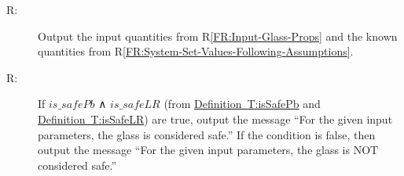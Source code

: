 \documentclass[12pt]{article}
\newcounter{reqnum}
\newcommand{\rthereqnum}{R\thereqnum}
\begin{document}
\begin{description}
\item[\rthereqnum\label{FR:Output-Values-and-Known-Quantities}:]Output the input quantities from R\ref{FR:Input-Glass-Props} and the known quantities from R\ref{FR:System-Set-Values-Following-Assumptions}.
\end{description}
\begin{description}
\item[\rthereqnum\label{FR:Check-Glass-Safety}:]If $is\_safePb$ ∧ $is\_safeLR$ (from \hyperref[T:isSafePb]{Definition~T:isSafePb} and \hyperref[T:isSafeLR]{Definition~T:isSafeLR}) are true, output the message ``For the given input parameters, the glass is considered safe.'' If the condition is false, then output the message ``For the given input parameters, the glass is NOT considered safe.''
\end{description}
\end{document}
